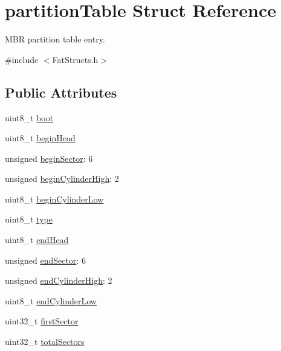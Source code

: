 \hypertarget{structpartition_table}{}\section{partition\+Table Struct Reference}
\label{structpartition_table}


M\+BR partition table entry.  




{\ttfamily \#include $<$Fat\+Structs.\+h$>$}

\subsection*{Public Attributes}
\begin{DoxyCompactItemize}
\item 
uint8\+\_\+t \hyperlink{structpartition_table_adf386afb1f33046d8b6a1a0afa780ec9}{boot}
\item 
uint8\+\_\+t \hyperlink{structpartition_table_a7d426694b8cf2151ae38568670a8c845}{begin\+Head}
\item 
unsigned \hyperlink{structpartition_table_ae201c11d9671c9efc307c654a2b6c026}{begin\+Sector}\+: 6
\item 
unsigned \hyperlink{structpartition_table_a744f0c7f9ad4c426b10de085b4f52392}{begin\+Cylinder\+High}\+: 2
\item 
uint8\+\_\+t \hyperlink{structpartition_table_a941fcb4df298f5f73ccca011bf40787a}{begin\+Cylinder\+Low}
\item 
uint8\+\_\+t \hyperlink{structpartition_table_a3861cf276c728c4dd30ca04e74197ee8}{type}
\item 
uint8\+\_\+t \hyperlink{structpartition_table_a4a3945bfd3a29f474984cb9f180dbd51}{end\+Head}
\item 
unsigned \hyperlink{structpartition_table_a27cdc4320c418ed0d833ab163ed77ad7}{end\+Sector}\+: 6
\item 
unsigned \hyperlink{structpartition_table_a32fea225b8ffd925ad919ffc56e9abda}{end\+Cylinder\+High}\+: 2
\item 
uint8\+\_\+t \hyperlink{structpartition_table_ad7829e34be70084abe145227b0d18274}{end\+Cylinder\+Low}
\item 
uint32\+\_\+t \hyperlink{structpartition_table_a02bbdff840c854dc96fa0b6da8589d86}{first\+Sector}
\item 
uint32\+\_\+t \hyperlink{structpartition_table_acf96e59ce648a9a0cf35751c3b6d7730}{total\+Sectors}
\end{DoxyCompactItemize}


